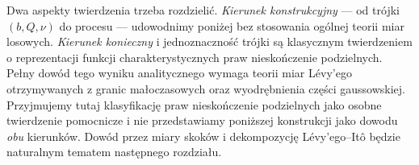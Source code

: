 \begin{uwaga}
Dwa aspekty twierdzenia trzeba rozdzielić. \emph{Kierunek
konstrukcyjny} --- od trójki $(b,Q,\nu)$ do procesu ---
udowodnimy poniżej bez stosowania ogólnej teorii miar losowych.
\emph{Kierunek konieczny} i jednoznaczność trójki
są klasycznym twierdzeniem o reprezentacji funkcji
charakterystycznych praw nieskończenie podzielnych.
Pełny dowód tego wyniku analitycznego wymaga teorii
miar Lévy'ego otrzymywanych z granic małoczasowych
oraz wyodrębnienia części gaussowskiej. Przyjmujemy tutaj
klasyfikację praw nieskończenie podzielnych jako
osobne twierdzenie pomocnicze i nie przedstawiamy poniższej
konstrukcji jako dowodu \emph{obu} kierunków.
Dowód przez miary skoków i dekompozycję Lévy'ego--Itô
będzie naturalnym tematem następnego rozdziału.
\end{uwaga}

